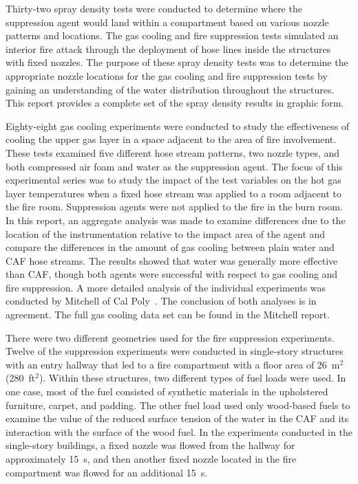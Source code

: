 \documentclass[12pt,oneside]{book}
\begin{document}
Thirty-two spray density tests were conducted to determine where the suppression agent would land within a compartment based on various nozzle patterns and locations. The gas cooling and fire suppression tests simulated an interior fire attack through the deployment of hose lines inside the structures with fixed nozzles. The purpose of these spray density tests was to determine the appropriate nozzle locations for the gas cooling and fire suppression tests by gaining an understanding of the water distribution throughout the structures. This report provides a complete set of the spray density results in graphic form.

Eighty-eight gas cooling experiments were conducted to study the effectiveness of cooling the upper gas layer in a space adjacent to the area of fire involvement. These tests examined five different hose stream patterns, two nozzle types, and both compressed air foam and water as the suppression agent. The focus of this experimental series was to study the impact of the test variables on the hot gas layer temperatures when a fixed hose stream was applied to a room adjacent to the fire room. Suppression agents were not applied to the fire in the burn room. In this report, an aggregate analysis was made to examine differences due to the location of the instrumentation relative to the impact area of the agent and compare the differences in the amount of gas cooling between plain water and CAF hose streams. The results showed that water was generally more effective than CAF, though both agents were successful with respect to gas cooling and fire suppression. A more detailed analysis of the individual experiments was conducted by Mitchell of Cal Poly~\cite{Mitchell:1}. The conclusion of both analyses is in agreement. The full gas cooling data set can be found in the Mitchell report.    

There were two different geometries used for the fire suppression experiments. Twelve of the suppression experiments were conducted in single-story structures with an entry hallway that led to a fire compartment with a floor area of 26~m$^2$ (280~ft$^2$). Within these structures, two different types of fuel loads were used. In one case, most of the fuel consisted of synthetic materials in the upholstered furniture, carpet, and padding. The other fuel load used only wood-based fuels to examine the value of the reduced surface tension of the water in the CAF and its interaction with the surface of the wood fuel. In the experiments conducted in the single-story buildings, a fixed nozzle was flowed from the hallway for approximately 15~s, and then another fixed nozzle located in the fire compartment was flowed for an additional 15~s.   
\end{document}
